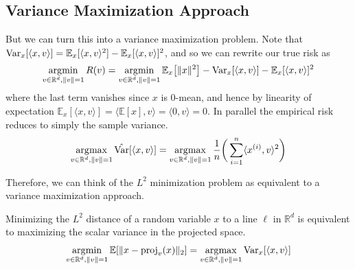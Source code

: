 \subsection{Variance Maximization Approach}

  But we can turn this into a variance maximization problem. Note that $\operatorname{Var}_x [\langle x, v \rangle] = \mathbb{E}_x [ \langle x, v \rangle^2 ] - \mathbb{E}_x [ \langle x, v \rangle]^2$, and so we can rewrite our true risk as 
  \begin{align}
    \operatorname*{\arg\!\min}_{v \in \mathbb{R}^d, \|v\|=1} R(v) = \operatorname*{\arg\!\min}_{v \in \mathbb{R}^d, \|v\|=1} \mathbb{E}_x \big[ \|x\|^2 \big] - \operatorname{Var}_x [\langle x, v \rangle] - \mathbb{E}_x [ \langle x, v \rangle]^2
  \end{align} 
  where the last term vanishes since $x$ is $0$-mean, and hence by linearity of expectation $\mathbb{E}_x [\langle x, v \rangle] = \langle \mathbb{E}[x], v \rangle = \langle 0, v \rangle = 0$. In parallel the empirical risk reduces to simply the sample variance. 
  \begin{equation}
    \operatorname*{\arg\!\max}_{v \in \mathbb{R}^{d}, \|v\| = 1} \hat{\operatorname{Var}}[ \langle x, v \rangle] = \operatorname*{\arg\!\max}_{v \in \mathbb{R}^{d}, \|v\| = 1} \frac{1}{n} \bigg( \sum_{i=1}^n \langle x^{(i)}, v \rangle^2 \bigg)
  \end{equation} 

  Therefore, we can think of the $L^2$ minimization problem as equivalent to a variance maximization approach.  

  \begin{lemma}
    Minimizing the $L^2$ distance of a random variable $x$ to a line $\ell$ in $\mathbb{R}^d$ is equivalent to maximizing the scalar variance in the projected space. 
    \begin{equation}
      \operatorname*{\arg\!\min}_{v \in \mathbb{R}^d, \|v\| = 1} \mathbb{E} [ \| x - \operatorname{proj}_v (x) \|_2 ] = \operatorname*{\arg\!\max}_{v \in \mathbb{R}^d, \|v\| = 1} \operatorname{Var}_x [\langle x, v \rangle ]
    \end{equation}
  \end{lemma}

